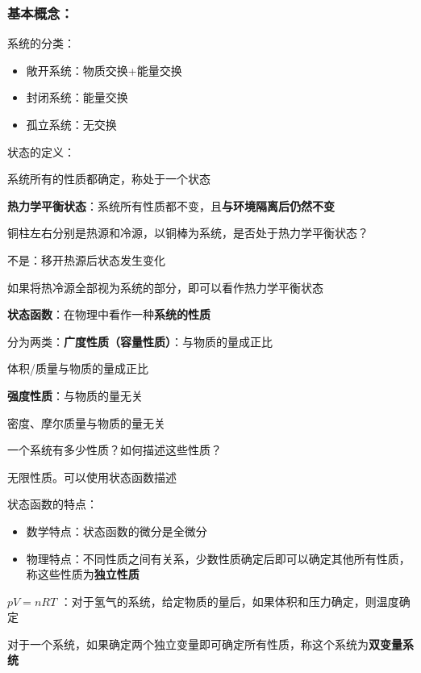 \subsubsection*{基本概念：}%
\label{subsub:基本概念：}
系统的分类：
\begin{itemize}
    \item 敞开系统：物质交换+能量交换
    \item 封闭系统：能量交换
    \item 孤立系统：无交换
    
\end{itemize}
状态的定义：
\begin{defi}
    系统所有的性质都确定，称处于一个状态
\end{defi}
\begin{notation}
    \textbf{热力学平衡状态}：系统所有性质都不变，且\textbf{与环境隔离后仍然不变}
\end{notation}
\begin{question}
    铜柱左右分别是热源和冷源，以铜棒为系统，是否处于热力学平衡状态？
\end{question}
\begin{sol}
    不是：移开热源后状态发生变化
\end{sol}
如果将热冷源全部视为系统的部分，即可以看作热力学平衡状态
\begin{defi}
    \textbf{状态函数}：在物理中看作一种\textbf{系统的性质}
\end{defi}
分为两类：\textbf{广度性质（容量性质）}：与物质的量成正比
\begin{eg}
    体积/质量与物质的量成正比
\end{eg}
\textbf{强度性质}：与物质的量无关
\begin{eg}
    密度、摩尔质量与物质的量无关
\end{eg}
\begin{question}
一个系统有多少性质？如何描述这些性质？
\end{question}
\begin{sol}
    无限性质。可以使用状态函数描述
\end{sol}
状态函数的特点：
\begin{itemize}
    \item 数学特点：状态函数的微分是全微分
    \item 物理特点：不同性质之间有关系，少数性质确定后即可以确定其他所有性质，称这些性质为\textbf{独立性质}
    
\end{itemize}
\begin{eg}
$pV=nRT$ ：对于氢气的系统，给定物质的量后，如果体积和压力确定，则温度确定
\end{eg}
对于一个系统，如果确定两个独立变量即可确定所有性质，称这个系统为\textbf{双变量系统}

